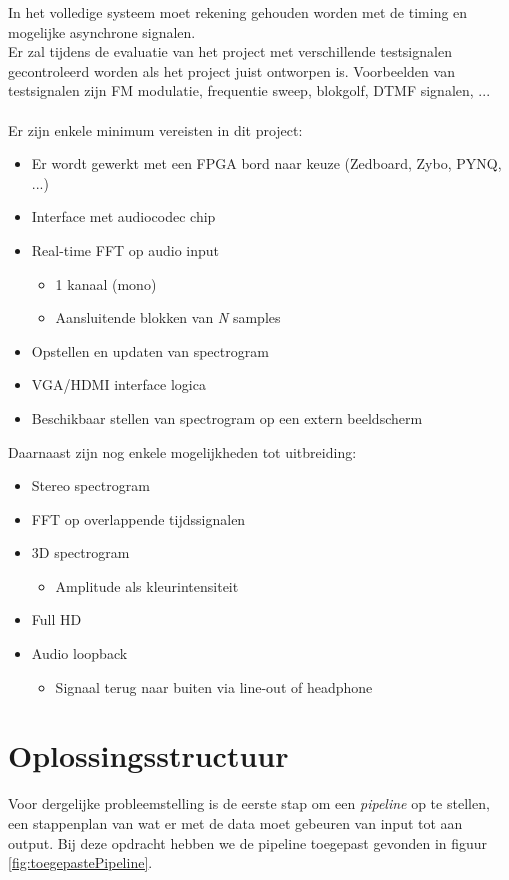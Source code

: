 \documentclass[a4paper,kul]{kulakarticle} %
\begin{document}
In het volledige systeem moet rekening gehouden worden met de timing en mogelijke asynchrone signalen. \\
Er zal tijdens de evaluatie van het project met verschillende testsignalen gecontroleerd worden als het project juist ontworpen is. Voorbeelden van testsignalen zijn FM modulatie, frequentie sweep, blokgolf, DTMF signalen, ... \\
\\ Er zijn enkele minimum vereisten in dit project:
\begin{itemize}
	\item Er wordt gewerkt met een FPGA bord naar keuze (Zedboard, Zybo, PYNQ, ...)
	\item Interface met audiocodec chip
	\item Real-time FFT op audio input
	\begin{itemize}
		\item 1 kanaal (mono)
		\item Aansluitende blokken van \textit{N} samples
	\end{itemize}
	\item Opstellen en updaten van spectrogram
	\item VGA/HDMI interface logica
	\item Beschikbaar stellen van spectrogram op een extern beeldscherm
\end{itemize}
Daarnaast zijn nog enkele mogelijkheden tot uitbreiding:
\begin{itemize}
	\item Stereo spectrogram
	\item FFT op overlappende tijdssignalen
	\item 3D spectrogram
	\begin{itemize}
		\item Amplitude als kleurintensiteit
	\end{itemize}
	\item Full HD
	\item Audio loopback
	\begin{itemize}
		\item Signaal terug naar buiten via line-out of headphone
	\end{itemize}
\end{itemize}

\section{Oplossingsstructuur}
Voor dergelijke probleemstelling is de eerste stap om een \textit{pipeline} op te stellen, een stappenplan van wat er met de data moet gebeuren van input tot aan output. Bij deze opdracht hebben we de pipeline toegepast gevonden in figuur \ref{fig:toegepastePipeline}.
\end{document}
